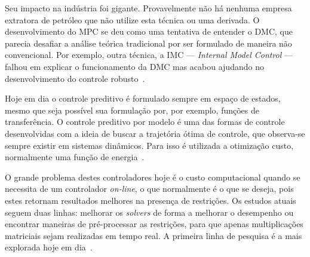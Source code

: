 Seu impacto na indústria foi gigante. Provavelmente não há nenhuma empresa
extratora de petróleo que não utilize esta técnica ou uma derivada. O
desenvolvimento do \ac{MPC} se deu como uma tentativa de entender o \ac{DMC},
que parecia desafiar a análise teórica tradicional por ser formulado de maneira
não convencional. Por exemplo, outra técnica, a \ac{IMC} --- \textit{Internal
Model Control} --- falhou em explicar o funcionamento da DMC mas acabou ajudando
no desenvolvimento do controle robusto~\cite{article:morari}.

Hoje em dia o controle preditivo é formulado sempre em espaço de estados, mesmo
que seja possível sua formulação por, por exemplo, funções de transferência.
O controle preditivo por modelo é uma das formas de controle desenvolvidas com
a ideia de buscar a trajetória ótima de controle, que observa-se sempre existir
em sistemas dinâmicos. Para isso é utilizada a otimização custo, normalmente uma
função de energia~\cite{article:morari,book:bryson}.

O grande problema destes controladores hoje é o custo computacional quando se
necessita de um controlador \textit{on-line}, o que normalmente é o que se
deseja, pois estes retornam resultados melhores na presença de restrições. Os
estudos atuais seguem duas linhas: melhorar os \textit{solvers} de forma a
melhorar o desempenho ou encontrar maneiras de pré-processar as restrições, para
que apenas multiplicações matriciais sejam realizadas em tempo real. A primeira
linha de pesquisa é a mais explorada hoje em
dia~\cite{book:wang,masterthesis:zhang}.
